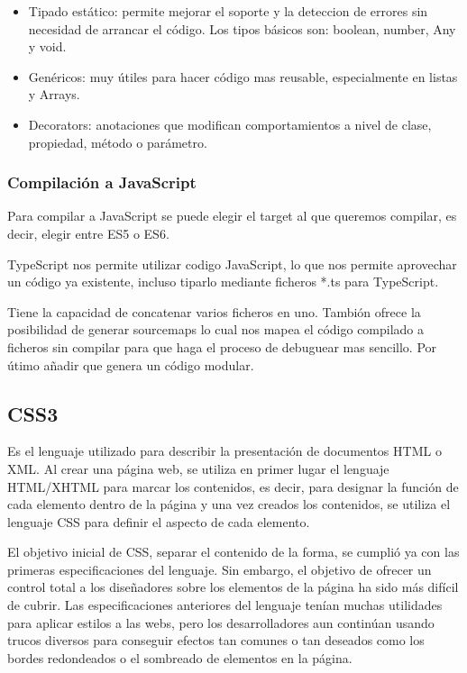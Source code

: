 \documentclass[a4paper, 12pt]{book}
\begin{document}
\begin{itemize}
  \item Tipado est\'atico: permite mejorar el soporte y la deteccion de errores sin necesidad de arrancar el c\'odigo. Los tipos b\'asicos son: boolean, number, Any y void.
\item Gen\'ericos: muy \'utiles para hacer c\'odigo mas reusable, especialmente en listas y Arrays.
\item Decorators: anotaciones que modifican comportamientos a nivel de clase, propiedad, m\'etodo o par\'ametro.

\end{itemize}

\subsubsection{Compilaci\'on a JavaScript}
\label{subsec:compilacion}

Para compilar a JavaScript se puede elegir el target al que queremos compilar, es decir, elegir entre ES5 o ES6.

TypeScript nos permite utilizar codigo JavaScript, lo que nos permite aprovechar un c\'odigo ya existente, incluso tiparlo mediante ficheros *.ts para TypeScript.

Tiene la capacidad de concatenar varios ficheros en uno. Tambi\'on ofrece la posibilidad de generar sourcemaps lo cual nos mapea el c\'odigo compilado a ficheros sin compilar para que haga el proceso de debuguear mas sencillo. Por \'utimo a\~nadir que genera un c\'odigo modular.

\subsection{CSS3}
\label{subsec:estilo}

Es el lenguaje utilizado para describir la presentaci\'on de documentos HTML o XML. Al
crear una p\'agina web, se utiliza en primer lugar el lenguaje HTML/XHTML para marcar los
contenidos, es decir, para designar la funci\'on de cada elemento dentro de la p\'agina y una vez
creados los contenidos, se utiliza el lenguaje CSS para definir el aspecto de cada elemento.

El objetivo inicial de CSS, separar el contenido de la forma, se cumpli\'o ya con las primeras
especificaciones del lenguaje. Sin embargo, el objetivo de ofrecer un control total a los dise\~nadores
sobre los elementos de la p\'agina ha sido m\'as dif\'icil de cubrir. Las especificaciones anteriores
del lenguaje ten\'ian muchas utilidades para aplicar estilos a las webs, pero los desarrolladores
aun contin\'uan usando trucos diversos para conseguir efectos tan comunes o tan deseados como
los bordes redondeados o el sombreado de elementos en la p\'agina.
\end{document}
